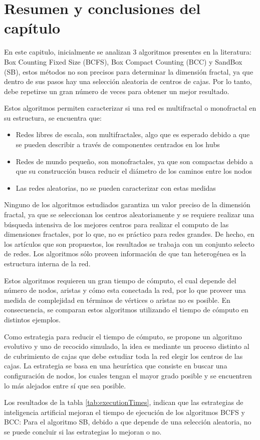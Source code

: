 \newpage
\section{Resumen y conclusiones del capítulo}

En este capitulo, inicialmente se analizan 3 algoritmos presentes en la literatura: Box Counting Fixed Size (BCFS), Box Compact Counting (BCC) y SandBox (SB), estos métodos no son precisos para determinar la dimensión fractal, ya que dentro de sus pasos hay una selección aleatoria de centros de cajas. Por lo tanto, debe repetirse un gran número de veces para obtener un mejor resultado.

Estos algoritmos permiten caracterizar si una red es multifractal o monofractal en su estructura, se encuentra que:

\begin{itemize}
    \item Redes libres de escala, son multifractales, algo que es esperado debido a que se pueden describir a través de componentes centrados en los hubs
    \item Redes de mundo pequeño, son monofractales, ya que son compactas debido a que su construcción busca reducir el diámetro de los caminos entre los nodos
    \item Las redes aleatorias, no se pueden caracterizar con estas medidas
\end{itemize}

Ninguno de los algoritmos estudiados garantiza un valor preciso de la dimensión fractal, ya que se seleccionan los centros aleatoriamente y se requiere realizar una búsqueda intensiva de los mejores centros para realizar el computo de las dimensiones fractales, por lo que, no es práctico para redes grandes. De hecho, en los artículos que son propuestos, los resultados se trabaja con un conjunto selecto de redes. Los algoritmos sólo proveen información de que tan heterogénea es la estructura interna de la red.

Estos algoritmos requieren un gran tiempo de cómputo, el cual depende del número de nodos, aristas y cómo esta conectada la red, por lo que proveer una medida de complejidad en términos de vértices o aristas no es posible. En consecuencia, se comparan estos algoritmos utilizando el tiempo de cómputo en distintos ejemplos.

Como estrategia para reducir el tiempo de cómputo, se propone un algoritmo evolutivo y uno de recocido simulado, la idea es mediante un proceso distinto al de cubrimiento de cajas que debe estudiar toda la red elegir los centros de las cajas. La estrategia se basa en una heurística que consiste en buscar una configuración de nodos, los cuales tengan el mayor grado posible y se encuentren lo más alejados entre sí que sea posible.

Los resultados de la tabla \ref{tab:executionTimes}, indican que las estrategias de inteligencia artificial mejoran el tiempo de ejecución de los algoritmos BCFS y BCC: Para el algoritmo SB, debido a que depende de una selección aleatoria, no se puede concluir si las estrategias lo mejoran o no.